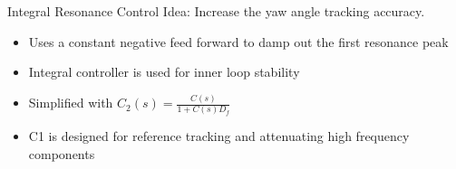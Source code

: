 \documentclass[10pt]{beamer}
\begin{document}
\begin{frame}{Integral Resonance Control}
  \alert{Idea}: Increase the yaw angle tracking accuracy.
  \begin{itemize}
    \item Uses a constant negative feed forward to damp out the first resonance peak
    \item Integral controller is used for inner loop stability
    \item Simplified with $C_2(s) = \frac{C(s)}{1+C(s)D_f}$
    \item C1 is designed for reference tracking and attenuating high frequency components
  \end{itemize}
  \vspace{-1cm}
  \begin{figure}[h!]
    \centering %
     \\ \vspace{-1cm}
  \end{figure}
\end{frame}
\end{document}
